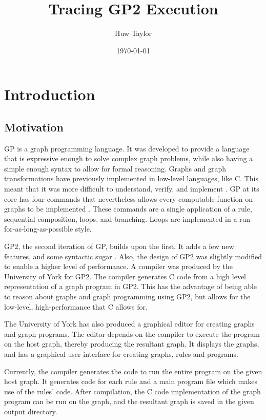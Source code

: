 \documentclass{UoYCSproject}
\author{Huw Taylor}
\title{Tracing GP2 Execution} %
\date{\today}
\begin{document}
\maketitle
\tableofcontents

\chapter{Introduction}
\section{Motivation}
GP is a graph programming language. It was developed to provide a language that is expressive enough to solve complex graph problems, while also having a simple enough syntax to allow for formal reasoning. Graphs and graph transformations have previously implemented in low-level languages, like C. This meant that it was more difficult to understand, verify, and implement \cite{gp_lang}. GP at its core has four commands that nevertheless allows every computable function on graphs to be implemented \cite{gp1}. These commands are a single application of a rule, sequential composition, loops, and branching. Loops are implemented in a run-for-as-long-as-possible style.

GP2, the second iteration of GP, builds upon the first. It adds a few new features, and some syntactic sugar \cite{gp2_design}. Also, the design of GP2 was slightly modified to enable a higher level of performance. A compiler was produced by the University of York for GP2. The compiler generates C code from a high level representation of a graph program in GP2. This has the advantage of being able to reason about graphs and graph programming using GP2, but allows for the low-level, high-performance that C allows for.

The University of York has also produced a graphical editor for creating graphs and graph programs. The editor depends on the compiler to execute the program on the host graph, thereby producing the resultant graph. It displays the graphs, and has a graphical user interface for creating graphs, rules and programs.

Currently, the compiler generates the code to run the entire program on the given host graph. It generates code for each rule and a main program file which makes use of the rules' code. After compilation, the C code implementation of the graph program can be run on the graph, and the resultant graph is saved in the given output directory.
\end{document}
